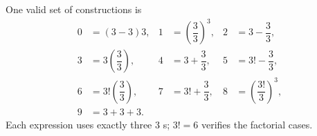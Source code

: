 One valid set of constructions is\[\begin{aligned}0&=(3-3)3,&1&=\left(\dfrac{3}{3}\right)^3,&2&=3-\dfrac{3}{3},\\3&=3\left(\dfrac{3}{3}\right),&4&=3+\dfrac{3}{3},&5&=3!-\dfrac{3}{3},\\6&=3!\left(\dfrac{3}{3}\right),&7&=3!+\dfrac{3}{3},&8&=\left(\dfrac{3!}{3}\right)^3,\\9&=3+3+3.\end{aligned}\]Each expression uses exactly three 3 s; $3!=6$ verifies the factorial cases.
